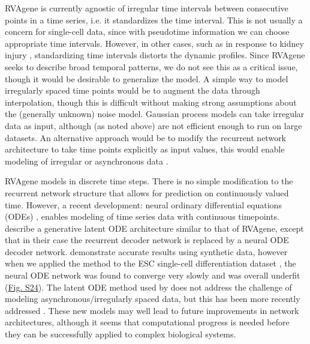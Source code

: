 RVAgene is currently agnostic of irregular time intervals between consecutive points in a time series,  i.e. it standardizes the time interval. This is not usually a concern for single-cell data, since with pseudotime information we can choose appropriate time intervals. However, in other cases, such as in response to kidney injury \citep{liu2017molecular}, standardizing time intervals distorts the dynamic profiles. Since RVAgene seeks to describe broad temporal patterns, we do not see this as a critical issue, though it would be desirable to generalize the model. A simple way to model irregularly spaced time points would be to augment the data through interpolation, though this is difficult without making strong assumptions about the (generally unknown) noise model. Gaussian process models \citep{McDowell2018, hensman2013hierarchical} can take irregular data as input, although (as noted above) are not efficient enough to run on large datasets. An alternative approach would be to modify the recurrent network architecture to take time points explicitly as input values, this would enable modeling of irregular or asynchronous data \citep{wu2018modeling}.
\par
RVAgene models in discrete time steps. There is no simple modification to the recurrent network structure that allows for prediction on continuously valued time. However, a recent development: neural ordinary differential equations (ODEs) \citep{chen2018neural}, enables modeling of time series data with continuous timepoints. \citet{chen2018neural} describe a generative latent ODE architecture similar to that of RVAgene, except that in their case the recurrent decoder network is replaced by a neural ODE decoder network. \citet{chen2018neural} demonstrate accurate results using synthetic data, however when we applied the method to the ESC single-cell differentiation dataset \citep{Klein2015}, the neural ODE network was found to converge very slowly and was overall underfit (\hyperref[fig:figS9]{Fig. S24}). The latent ODE method used by \citet{chen2018neural} does not address the challenge of modeling asynchronous/irregularly spaced data, but this has been more recently addressed \citep{rubanova2019latent}. These new models may well lead to future improvements in network architectures, although it seems that computational progress is needed before they can be successfully applied to complex biological systems.
\par 
